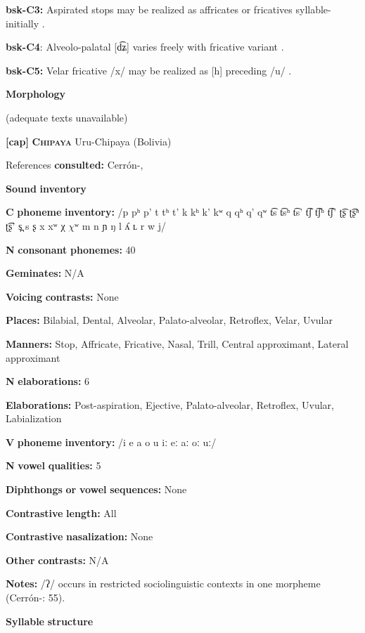 \begin{styleBody}
\textbf{bsk-C3:} Aspirated stops may be realized as affricates or fricatives syllable-initially \citep[1025]{Anderson1997}.

\textbf{bsk-C4}: Alveolo-palatal [d͡ʑ] varies freely with fricative variant \citep[1025]{Anderson1997}.

\textbf{bsk-C5:} Velar fricative /x/ may be realized as [h] preceding /u/ \citep[1025]{Anderson1997}.

\textbf{Morphology}

(adequate texts unavailable)

\textbf{[cap]}   \textbf{\textsc{Chipaya}}  Uru-Chipaya (Bolivia)

References \textbf{consulted:} Cerrón-\citet{Palomino2006}, \citet{Olson1967}

\textbf{Sound} \textbf{inventory}

\textbf{C} \textbf{phoneme} \textbf{inventory:} /p pʰ p’ t tʰ t’ k kʰ k’ kʷ q qʰ q’ qʷ t͡s t͡sʰ t͡s’ t͡ʃ t͡ʃʰ t͡ʃ’ ʈ͡ʂ ʈ͡ʂʰ ʈ͡ʂ’ s̪ s ʂ x xʷ χ $\chi ʷ$ m n ɲ ŋ l ʎ ʟ r w j/

\textbf{N} \textbf{consonant} \textbf{phonemes:} 40

\textbf{Geminates:} N/A

\textbf{Voicing} \textbf{contrasts:} None

\textbf{Places:} Bilabial, Dental, Alveolar, Palato-alveolar, Retroflex, Velar, Uvular

\textbf{Manners:} Stop, Affricate, Fricative, Nasal, Trill, Central approximant, Lateral approximant

\textbf{N} \textbf{elaborations:} 6

\textbf{Elaborations:} Post-aspiration, Ejective, Palato-alveolar, Retroflex, Uvular, Labialization

\textbf{V} \textbf{phoneme} \textbf{inventory:} /i e a o u iː eː aː oː uː/

\textbf{N} \textbf{vowel} \textbf{qualities:} 5

\textbf{Diphthongs} \textbf{or} \textbf{vowel} \textbf{sequences:} None

\textbf{Contrastive} \textbf{length:} All

\textbf{Contrastive} \textbf{nasalization:} None

\textbf{Other} \textbf{contrasts:} N/A

\textbf{Notes:} /ʔ/ occurs in restricted sociolinguistic contexts in one morpheme (Cerrón-\citealt{Palomino2006}: 55).

\textbf{Syllable} \textbf{structure}


\end{styleBody}
